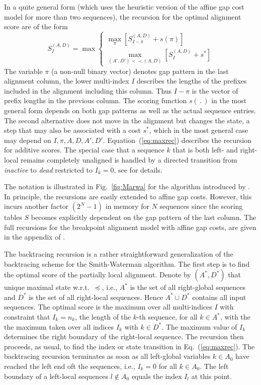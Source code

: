\documentclass[a4paper,10pt]{article}
\newcommand{\pprec}{\mathrel{\prec\!\!\!\prec}}
\begin{document}
In a quite general form (which uses the heuristic version of the affine gap
cost model for more than two sequences), the recursion for the optimal
alignment score are of the form
\begin{equation} 
  S^{(A,D)}_I = \max 
      \begin{cases}
        \displaystyle\max_{\pi} 
            \left[ S^{(A,D)}_{I-\pi} + s(\pi)
                    \right]
        \\
        \displaystyle\max_{(A',D')\pprec(A,D)}  
                    \left[ S^{(A,D)}_I + s^*\right]
       \end{cases} 
\label{eq:maxrec}
\end{equation}
The variable $\pi$ (a non-null binary vector) denotes gap pattern in the
last alignment column, the lower multi-index $I$ describes the lengths of
the prefixes included in the alignment including this column.  Thus $I-\pi$
is the vector of prefix lengths in the previous column. The scoring
function $s(\,.\,)$ in the most general form depends on both gap patterns
as well as the actual sequence entries. The second alternative does not
move in the alignment but changes the state, a step that may also be
associated with a cost $s^*$, which in the most general case may depend on
$I,\pi,A,D,A',D'$. Equation~(\ref{eq:maxrec}) describes the recursion for
additive scores. The special case that a sequence $k$ that is both left- and
right-local remains completely unaligned is handled by a directed
transition from \textit{inactive} to \textit{dead} restricted to $I_k=0$,
see \citet{Retzlaff:18a} for details.

The notation is illustrated in Fig.~\ref{fig:Marwa} for the algorithm
introduced by \citet{AlArab:17a}. In principle, the recursions are easily
extended to affine gap costs. However, this incurs another factor $(2^N-1)$
in memory for $N$ sequences since the scoring tables $S$ becomes explicitly
dependent on the gap pattern of the last column. The full recursions for
the breakpoint alignment model with affine gap costs, are given in the
appendix of \citet{Retzlaff:18a}.

The backtracing recursion is a rather straightforward generalization of
the backtracing scheme for the Smith-Waterman algorithm. The first step is
to find the optimal score of the partially local alignment. Denote by $(A^*,D^*)$
that unique maximal state w.r.t.\ $\preceq$, i.e., $A^*$ is the set of all
right-global sequences and $D^*$ is the set of all right-local
sequences. Hence $A^*\cup D^*$ contains all input sequences.  The optimal
score is the maximum over all multi-indices $I$ with constraint that
$I_k=n_k$, the length of the $k$-th sequence, for all $k\in A^*$, with the
the maximum taken over all indices $I_k$ with $k\in D^*$.  The maximum
value of $I_k$ determines the right boundary of the right-local sequence.
The recursion then proceeds, as usual, to find the index or state
transition in Eq.~(\ref{eq:maxrec}). The backtracing recursion terminates
as soon as all left-global variables $k\in A_0$ have reached the left end
oft the sequences, i.e., $I_k=0$ for all $k\in A_0$.  The left boundary of
a left-local sequences $l\notin A_0$ equals the index $I_l$ at this point.
\end{document}
